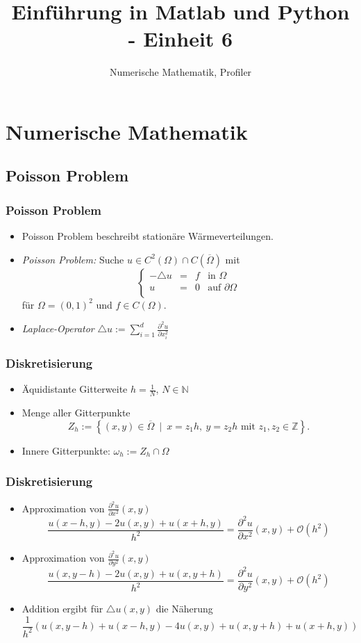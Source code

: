 \documentclass[hyperref={xetex}]{beamer}
\title{Einführung in Matlab und Python - Einheit 6}
\subtitle{Numerische Mathematik, Profiler}
\begin{document}
\titlepage

\section{Numerische Mathematik}

\subsection{Poisson Problem}
%
% 
\begin{frame}[fragile]\frametitle{Poisson Problem}
\begin{itemize}
\item Poisson Problem beschreibt station\"are W\"armeverteilungen.
\item {\it Poisson Problem:} Suche  $u \in
C^2(\Omega)\cap C(\overline{\Omega})$ mit
\[
\left \{ \begin{array}{rcll}
- \triangle u & = & f & \mbox{in } \Omega\\
u & = & 0 & \mbox{auf } \partial \Omega\\ 
\end{array} \right.
\]
f\"ur $\Omega=(0,1)^2$ und $f \in C(\Omega)$.
\item  {\it Laplace-Operator} 
$ \triangle u := \sum_{i=1}^d \frac{\partial ^2 u}{\partial x_i^2} $
\end{itemize}
\end{frame}
%
% 
\begin{frame}[fragile]\frametitle{Diskretisierung}
\begin{itemize}
\item \"Aquidistante Gitterweite $h= \frac 1 N$,
$N \in \mathbb{N}$
\item Menge aller Gitterpunkte 
\[ Z_h := \left\{ (x,y) \in \overline{\Omega} \ \mid \ x=z_1h, \ y=z_2h \text{ mit }
z_1,z_2 \in \mathbb{Z} \right\}. \]
\item Innere Gitterpunkte: $\omega_h := Z_h \cap \Omega$
\end{itemize}
\end{frame}
%
% 
\begin{frame}[fragile]\frametitle{Diskretisierung}
\begin{itemize}
\item Approximation von $ \frac{\partial ^2 u}{\partial
  x^2} (x,y)$
{\small \[ \frac{u(x -h,y) - 2 u(x,y) + u(x+h,y)}{h^2} = \frac{\partial ^2 u}{\partial
  x^2} (x,y) + \mathcal{O}(h^2) \]}
\item  Approximation von $ \frac{\partial ^2 u}{\partial
  y^2} (x,y)$
{\small \[ \frac{u(x ,y-h) - 2 u(x,y) + u(x,y+h)}{h^2} = \frac{\partial ^2 u}{\partial
  y^2} (x,y) + \mathcal{O}(h^2) \]}
\item Addition ergibt f\"ur $ \triangle u(x,y)$ die N\"aherung
{\footnotesize \[
 \frac{1}{h^2} \left( u(x,y-h) + u(x-h,y) - 4 u(x,y) + u(x,y+h) +
 u(x+h,y)  \right) 
\] }
\end{itemize}
\end{frame}
\end{document}
